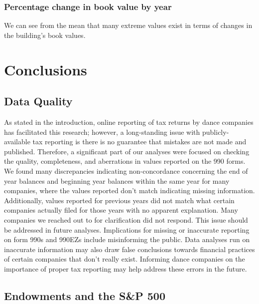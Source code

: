 \documentclass[Dance Data
Project,article,submit,moreauthors,pdftex]{mdpi}
\begin{document}
\hypertarget{percentage-change-in-book-value-by-year}{%
\subsubsection{Percentage change in book value by
year}\label{percentage-change-in-book-value-by-year}}

We can see from the mean that many extreme values exist in terms of
changes in the building's book values.

\hypertarget{conclusions}{%
\section{Conclusions}\label{conclusions}}

\hypertarget{data-quality}{%
\subsection{Data Quality}\label{data-quality}}

As stated in the introduction, online reporting of tax returns by dance
companies has facilitated this research; however, a long-standing issue
with publicly-available tax reporting is there is no guarantee that
mistakes are not made and published. Therefore, a significant part of
our analyses were focused on checking the quality, completeness, and
aberrations in values reported on the 990 forms. We found many
discrepancies indicating non-concordance concerning the end of year
balances and beginning year balances within the same year for many
companies, where the values reported don't match indicating missing
information. Additionally, values reported for previous years did not
match what certain companies actually filed for those years with no
apparent explanation. Many companies we reached out to for clarification
did not respond. This issue should be addressed in future analyses.
Implications for missing or inaccurate reporting on form 990s and 990EZs
include misinforming the public. Data analyses run on inaccurate
information may also draw false conclusions towards financial practices
of certain companies that don't really exist. Informing dance companies
on the importance of proper tax reporting may help address these errors
in the future.

\hypertarget{endowments-and-the-sp-500}{%
\subsection{Endowments and the S\&P
500}\label{endowments-and-the-sp-500}}
\end{document}
